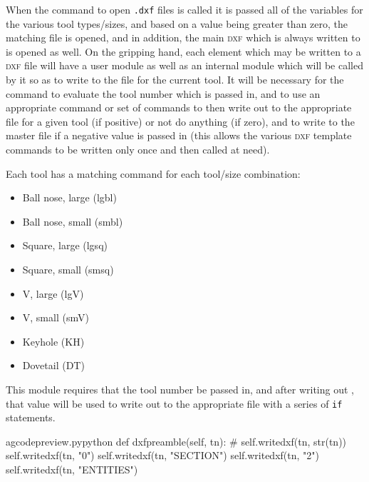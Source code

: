 \documentclass{ltxdoc}
\begin{document}
When the command to open \verb|.dxf| files is called it is passed all of the variables for the various tool types/sizes, and based on a value being greater than zero, the matching file is opened, and in addition, the main \textsc{dxf} which is always written to is opened as well. On the gripping hand, each element which may be written to a \textsc{dxf} file will have a user module as well as an internal module which will be called by it so as to write to the file for the current tool. It will be necessary for the  command to evaluate the tool number which is passed in, and to use an appropriate command or set of commands to then write out to the appropriate file for a given tool (if positive) or not do anything (if zero), and to write to the master file if a negative value is passed in (this allows the various \textsc{dxf} template commands to be written only once and then called at need).

Each tool has a matching command for each tool/size combination:

\begin{itemize}
\item Ball nose, large (lgbl) 
\item Ball nose, small (smbl) 
\item Square, large (lgsq) 
\item Square, small (smsq) 
\item V, large (lgV) 
\item V, small (smV) 
\item Keyhole (KH) 
\item Dovetail (DT) 
\end{itemize}
 

This module requires that the tool number be passed in, and after writing out , that value will be used to write out to the appropriate file with a series of \texttt{if} statements.
 
\lstset{firstnumber=\thegcpy}
\begin{writecode}{a}{gcodepreview.py}{python}
    def dxfpreamble(self, tn):
#        self.writedxf(tn, str(tn))
        self.writedxf(tn, "0")
        self.writedxf(tn, "SECTION")
        self.writedxf(tn, "2")
        self.writedxf(tn, "ENTITIES")

\end{writecode}
\addtocounter{gcpy}{7}
\end{document}
